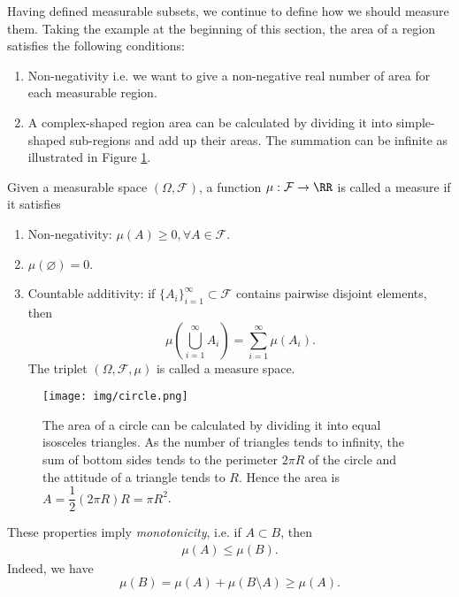 Having defined measurable subsets, we continue to define how we should measure them. Taking the example at the beginning of this section, the area of a region satisfies the following conditions:
\begin{enumerate}
    \item Non-negativity i.e. we want to give a non-negative real number of area for each measurable region.
    \item A complex-shaped region area can be calculated by dividing it into simple-shaped sub-regions and add up their areas. The summation can be infinite as illustrated in Figure \ref{figure:circle}.
\end{enumerate}

\begin{definition}
    Given a measurable space $(\Omega,\mathcal{F})$, a function $\mu:\mathcal{F}\to\RR$ is called a measure if it satisfies
    \begin{enumerate}
        \item Non-negativity: $\mu(A)\ge0,\forall A\in\mathcal{F}.$
        \item $\mu(\varnothing)=0$.
        \item Countable additivity: if $\{A_i\}_{i=1}^\infty\subset\mathcal{F}$ contains pairwise disjoint elements, then
              $$\mu\left(\bigcup\limits_{i=1}^\infty A_i\right)=\sum\limits_{i=1}^\infty \mu(A_i).$$
              The triplet $(\Omega,\mathcal{F},\mu)$ is called a measure space.
    \end{enumerate}
\end{definition}

\begin{figure}[h]
    \centering
    \texttt{[image: img/circle.png]}
    \vspace{0.5cm}
    \caption[Circle area approximation]{The area of a circle can be calculated by dividing it into equal isosceles triangles. As the number of triangles tends to infinity, the sum of bottom sides tends to the perimeter $2\pi R$ of the circle and the attitude of a triangle tends to $R$. Hence the area is $A=\dfrac{1}{2}(2\pi R)R=\pi R^2$.}
    \label{figure:circle}
\end{figure}

\begin{remark}
    These properties imply \textit{monotonicity}, i.e. if $A\subset B$, then
    \begin{align}
        \mu(A)\le\mu(B).
    \end{align}
    Indeed, we have $$\mu(B)=\mu(A)+\mu(B\setminus A)\ge \mu(A).$$
\end{remark}

